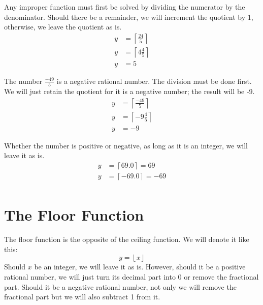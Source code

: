 \documentclass[twoside,openany,12pt]{book}
\begin{document}
    Any improper function must first be solved by dividing the numerator by the denominator. Should there be a remainder, we will increment the quotient by 1, otherwise, we leave the quotient as is.
    \begin{equation*}
        \begin{split}
            y &= \left\lceil \frac{24}{5} \right\rceil \\
            y &= \left\lceil 4\frac{4}{5} \right\rceil \\
            y &= 5
        \end{split}
    \end{equation*}

    The number $\frac{-49}{5}$ is a negative rational number. The division must be done first. We will just retain the quotient for it is a negative number; the result will be -9.
    \begin{equation*}
        \begin{split}
            y &= \left\lceil \frac{-49}{5} \right\rceil \\
            y &= \left\lceil -9\frac{4}{5} \right\rceil \\
            y &= -9
        \end{split}
    \end{equation*}

    Whether the number is positive or negative, as long as it is an integer, we will leave it as is.
    \begin{equation*}
        \begin{split}
            y &= \left\lceil 69.0 \right\rceil = 69\\
            y &= \left\lceil -69.0 \right\rceil = -69\\
        \end{split}
    \end{equation*}

    \section{The Floor Function}
    The floor function is the opposite of the ceiling function. We will denote it like this:
    \begin{equation}
        y = \left\lfloor x \right\rfloor
    \end{equation}
    Should $x$ be an integer, we will leave it as is. However, should it be a positive rational number, we will just turn its decimal part into 0 or remove the fractional part. Should it be a negative rational number, not only we will remove the fractional part but we will also subtract 1 from it.
\end{document}
